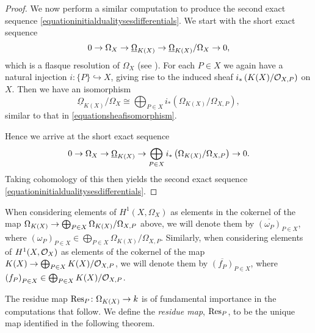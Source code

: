 \begin{proof}
    We now perform a similar computation to produce the second exact sequence \eqref{equationinitialdualitysesdifferentials}.
    We start with the short exact sequence
        \[
        0 \rightarrow \Omega_X \rightarrow \underline{\Omega}_{K(X)} \rightarrow \underline{\Omega}_{K(X)}/\Omega_X \rightarrow 0,
        \]
    which is a flasque resolution of $\Omega_X$ (see \cite[Chap.\ II, ex.\ 1.16]{hart}).
    For each $P \in X$ we again have a natural injection $i \colon \{ P \} \hookrightarrow X$, giving rise to the induced sheaf $i_*\left( K(X)/{\cal O}_{X,P} \right)$ on $X$.
    Then we have an isomorphism
        \begin{equation*}%
        \underline{\Omega}_{K(X)}/\Omega_X \cong \bigoplus_{P \in X} i_* \left( \Omega_{K(X)}/\Omega_{X,P}\right),
        \end{equation*}
    similar to that in \eqref{equationsheafisomorphism}.

    Hence we arrive at the short exact sequence
        \begin{equation}\label{equationshortexactsequencedifferentialsdirectsum}
        0 \rightarrow \Omega_X \rightarrow \underline{\Omega}_{K(X)} \rightarrow \bigoplus_{P \in X} i_* \left( \Omega_{K(X)}/\Omega_{X,P} \right)  \rightarrow 0.
        \end{equation}
    Taking cohomology of this then yields the second exact sequence \eqref{equationinitialdualitysesdifferentials}.
    \end{proof}

    \begin{rem}
        When considering elements of $H^1(X,\Omega_X)$ as elements in the cokernel of the map $\Omega_{K(X)} \rightarrow \bigoplus_{P \in X}\Omega_{K(X)}/\Omega_{X,P}$ above, we will denote them by $\overline{(\omega_P)}_{P \in X}$, where ${(\omega_P)}_{P \in X}\in \bigoplus_{P \in X}\Omega_{K(X)}/\Omega_{X,P}$.
        Similarly, when considering elements of $H^1(X,\mathcal{O}_X)$ as elements of the cokernel of the map $K(X) \rightarrow \bigoplus_{P \in X}K(X)/{\cal O}_{X,P}$, we will denote them by $\overline{(f_P)}_{P \in X}$, where ${(f_P)}_{P \in X} \in \bigoplus_{P \in X}K(X)/{\cal O}_{X,P}$.
    \end{rem}

The residue map $\operatorname{Res}_P \colon \Omega_{K(X)} \rightarrow k$ is of fundamental importance in the computations that follow.
We define the {\em residue map}, $\operatorname{Res}_P$, to be the unique map identified in the following theorem.

